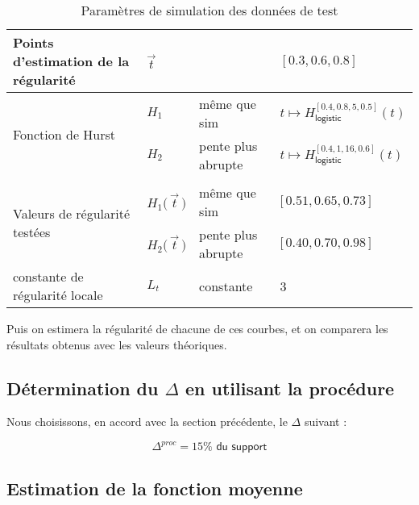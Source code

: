 \begin{table}[H]
\begin{tabularx}{\textwidth}{XXXX}
		\midrule
		Points d'estimation de la régularité                & $\vec t$                        &                    & $[0.3, 0.6, 0.8]$                                         \\
		\midrule
		\multirow{2}{\hsize}{Fonction de Hurst}             & $H_1$                           & même que sim       & $t \mapsto H^{[0.4, 0.8, 5, 0.5]}_{\textsf{logistic}}(t)$ \\
		                                                    & $H_2$                           & pente plus abrupte & $t \mapsto H^{[0.4, 1, 16, 0.6]}_{\textsf{logistic}}(t)$  \\
		\\
		\multirow{2}{\hsize}{Valeurs de régularité testées} & $H_1\bigl( \, \vec t \, \bigr)$ & même que sim       & $\bigl[ \, 0.51, 0.65, 0.73 \, \bigr]$                    \\
		                                                    & $H_2\bigl( \, \vec t \, \bigr)$ & pente plus abrupte & $\bigl[ \, 0.40, 0.70, 0.98 \, \bigr]$                    \\
		\midrule
		constante de régularité locale                      & $L_t$                           & constante          & 3                                                         \\
		\bottomrule
	\end{tabularx}
	\caption{Paramètres de simulation des données de test}
	\label{tab:sim_test_params}
\end{table}

\noindent Puis on estimera la régularité de chacune de ces courbes, et on comparera les résultats obtenus avec les valeurs théoriques.

\subsection{Détermination du $\Delta$ en utilisant la procédure}

Nous choisissons, en accord avec la section précédente, le $\Delta$ suivant :

\begin{equation*}
	\Delta^{proc} = 15\% \textsf{ du support}
\end{equation*}

\subsection{Estimation de la fonction moyenne}


